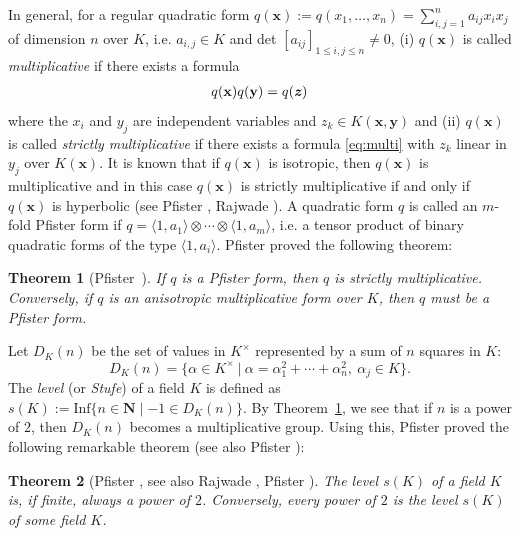 \documentclass[a4paper, 11pt]{amsart}
\theoremstyle{plain}
\newtheorem{thm}{Theorem}[section]
\theoremstyle{definition}
\numberwithin{equation}{section}
\begin{document}
In general, for a regular quadratic form 
$q(\mathbf{x}):=q(x_1,\ldots,x_n)=\sum_{i,j=1}^n a_{ij}x_ix_j$ 
of dimension $n$ over $K$, 
i.e. $a_{i,j}\in K$ and det\! $[a_{ij}]_{1\leq i,j\leq n}\neq 0$, 
(i) $q(\mathbf{x})$ is called {\it multiplicative} if there exists a formula
\begin{align}\label{eq:multi}
q(\mathbf{x})q(\mathbf{y})=q(\textbf{\textit{z}})
\end{align}
where the $x_i$ and $y_j$ are independent variables and 
$z_k\in K(\mathbf{x},\mathbf{y})$ 
and 
(ii) 
$q(\mathbf{x})$ is called {\it strictly multiplicative} 
if there exists a formula 
\eqref{eq:multi} with $z_k$ linear in $y_j$ over $K(\mathbf{x})$.
It is known that if $q(\mathbf{x})$ is isotropic, then 
$q(\mathbf{x})$ is  
multiplicative and in this case 
$q(\mathbf{x})$ is strictly multiplicative if and only if 
$q(\mathbf{x})$ is hyperbolic 
(see Pfister \cite[Chapter 2]{Pfi95}, Rajwade \cite[Chapter 12]{Raj93}). 
A quadratic form $q$ is called an $m$-fold Pfister form if
$q=\langle 1,a_1\rangle \otimes \cdots \otimes \langle 1,a_m\rangle$,
i.e. a tensor product of binary quadratic forms of the type $\langle 1,a_i\rangle$.
Pfister \cite{Pfi65b} proved the following theorem: 
%
\begin{thm}[Pfister\ \cite{Pfi65b}]\label{thm:Pfister} 
If $q$ is a Pfister form, then $q$ is strictly multiplicative. 
Conversely, if $q$ is an anisotropic multiplicative form over $K$, 
then $q$ must be a Pfister form. 
\end{thm}
%
Let $D_K(n)$ be the set of values in $K^{\times}$ represented by 
a sum of $n$ squares in $K$:  
\[
D_K(n)=\{\alpha\in K^{\times}\ |\ \alpha=\alpha_1^2+\cdots+\alpha_n^2,\ \alpha_j\in K\}.
\]
The \textit{level} (or {\it Stufe}) of a field $K$ is defined as 
$s(K):=\text{Inf}\{n\in\mathbf{N} \mid -1\in D_K(n)\}$. 
By Theorem~\ref{thm:Pfister}, we see that if $n$ is a power of $2$, 
then $D_K(n)$ becomes a multiplicative group. 
Using this, Pfister \cite{Pfi65a} proved the following remarkable theorem 
(see also Pfister \cite[page 28, Historical Note]{Pfi95}): 

\begin{thm}[{Pfister \cite[Satz 4, Satz 5]{Pfi65a}, see also Rajwade \cite[Chapter 2, Theorem~2.2]{Raj93}, Pfister \cite[Chapter 3, Theorem~1.3, Theorem~1.4]{Pfi95}}]
The level $s(K)$ of a field $K$ is, if finite, always a power of $2$. 
Conversely, every power of $2$ is the level $s(K)$ of some field $K$. 
\end{thm}
\end{document}

